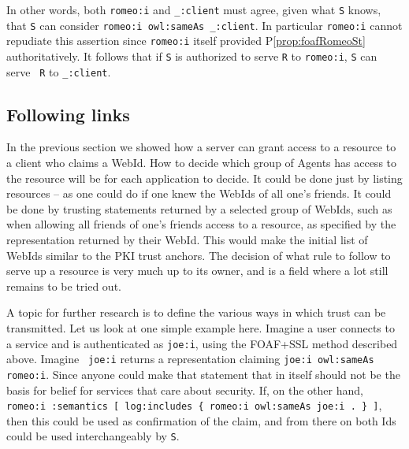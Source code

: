 \documentclass{llncs}
\begin{document}
In other words, both {\tt romeo:i} and {\tt \_:client} must agree,
given what {\tt S} knows, that {\tt S} can consider {\tt romeo:i
  owl:sameAs \_:client}.  In particular {\tt romeo:i} cannot repudiate
this assertion since {\tt romeo:i} itself provided
P\ref{prop:foafRomeoSt} authoritatively. It follows that if {\tt S} is
authorized to serve {\tt R} to {\tt romeo:i}, {\tt S} can serve {\tt
  R} to {\tt \_:client}.



\subsection{Following links}
\label{sec:LinkCrawling}

In the previous section we showed how a server can grant
access to a resource to a client who claims a WebId.  How to decide
which group of Agents has access to the resource will be for each
application to decide. It could be done just by listing resources --
as one could do if one knew the WebIds of all one's friends.  It could
be done by trusting statements returned by a selected group of WebIds,
such as when allowing all friends of one's friends access to a
resource, as specified by the representation returned by their
WebId. This would make the initial list of WebIds similar to the PKI  trust anchors.
 The decision of what rule to follow to serve up a resource is very much 
 up to its owner, and is a field where a lot still remains to be tried out.

A topic for further research is to define the various ways in which
trust can be transmitted. Let us look at one simple example
here. Imagine a user connects to a service and is authenticated as
{\tt joe:i}, using the FOAF+SSL method described above. Imagine {\tt
  joe:i} returns a representation claiming {\tt joe:i owl:sameAs
  romeo:i}. Since anyone could make that statement that in itself
should not be the basis for belief for services that care about
security. If, on the other hand, {\tt romeo:i :semantics [
    log:includes \{ romeo:i owl:sameAs joe:i . \} ]}, then this could be
used as confirmation of the claim, and from there on both Ids could be used 
interchangeably by {\tt S}.
\end{document}

